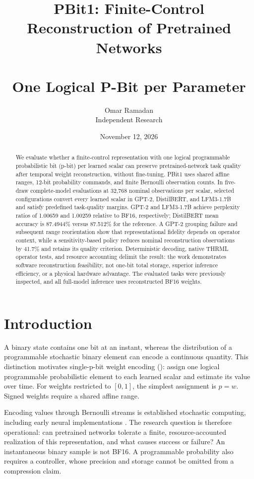 \documentclass[11pt]{article}
\title{PBit1: Finite-Control Reconstruction of Pretrained Networks\\\\ One Logical P-Bit per Parameter}\n\author{Omar Ramadan\\\small Independent Research}
\date{November 12, 2026}
\begin{document}
\maketitle
\begin{abstract}
We evaluate whether a finite-control representation with one logical programmable probabilistic bit (p-bit) per learned scalar can preserve pretrained-network task quality after temporal weight reconstruction, without fine-tuning. PBit1 uses shared affine ranges, 12-bit probability commands, and finite Bernoulli observation counts. In five-draw complete-model evaluations at 32,768 nominal observations per scalar, selected configurations convert every learned scalar in GPT-2, DistilBERT, and LFM3-1.7B and satisfy predefined task-quality margins. GPT-2 and LFM3-1.7B achieve perplexity ratios of 1.00659 and 1.00259 relative to BF16, respectively; DistilBERT mean accuracy is 87.4944\% versus 87.512\% for the reference. A GPT-2 grouping failure and subsequent range reorientation show that representational fidelity depends on operator context, while a sensitivity-based policy reduces nominal reconstruction observations by 41.7\% and retains its quality criterion. Deterministic decoding, native THRML operator tests, and resource accounting delimit the result: the work demonstrates software reconstruction feasibility, not one-bit total storage, superior inference efficiency, or a physical hardware advantage. The evaluated tasks were previously inspected, and all full-model inference uses reconstructed BF16 weights.
\end{abstract}

\section{Introduction}
A binary state contains one bit at an instant, whereas the distribution of a programmable stochastic binary element can encode a continuous quantity. This distinction motivates single-p-bit weight encoding (\SPW): assign one logical programmable probabilistic element to each learned scalar and estimate its value over time. For weights restricted to $[0,1]$, the simplest assignment is $p=w$. Signed weights require a shared affine range.

Encoding values through Bernoulli streams is established stochastic computing, including early neural implementations \citep{shawe1995}. The research question is therefore operational: can pretrained networks tolerate a finite, resource-accounted realization of this representation, and what causes success or failure? An instantaneous binary sample is not BF16. A programmable probability also requires a controller, whose precision and storage cannot be omitted from a compression claim.
\end{document}
